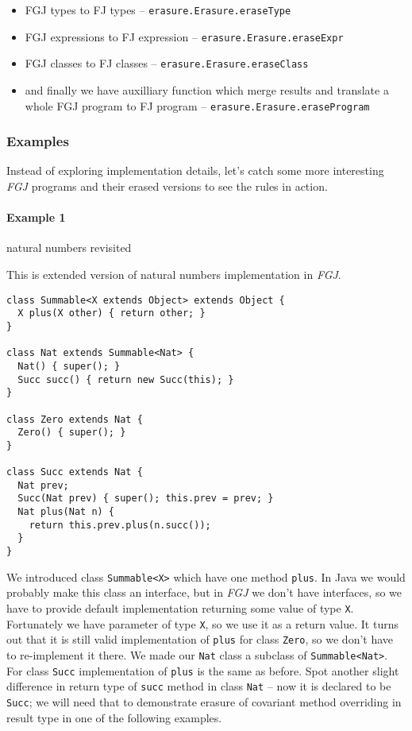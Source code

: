 \documentclass{article}[12pt]
\begin{document}
\begin{itemize}
\item FGJ types to FJ types -- \texttt{erasure.Erasure.eraseType}
\item FGJ expressions to FJ expression --
  \texttt{erasure.Erasure.eraseExpr}
\item FGJ classes to FJ classes -- \texttt{erasure.Erasure.eraseClass}
\item and finally we have auxilliary function which merge results
  and translate a whole FGJ program to FJ program --
  \texttt{erasure.Erasure.eraseProgram}
\end{itemize}

\subsubsection{Examples}

Instead of exploring implementation details, let's catch some more
interesting \emph{FGJ} programs and their erased versions to see
the rules in action.

\paragraph{Example 1} natural numbers revisited

This is extended version of natural numbers implementation in
\emph{FGJ}.

\begin{verbatim}
class Summable<X extends Object> extends Object {
  X plus(X other) { return other; }
}

class Nat extends Summable<Nat> {
  Nat() { super(); }
  Succ succ() { return new Succ(this); }
}

class Zero extends Nat { 
  Zero() { super(); }
}

class Succ extends Nat {
  Nat prev;
  Succ(Nat prev) { super(); this.prev = prev; }
  Nat plus(Nat n) {
    return this.prev.plus(n.succ());
  }
}
\end{verbatim}

We introduced class \texttt{Summable<X>} which have one method
\texttt{plus}. In Java we would probably make this class an
interface, but in \emph{FGJ} we don't have interfaces, so we have
to provide default implementation returning some value of type
\texttt{X}. Fortunately we have parameter of type \texttt{X},
so we use it as a return value. It turns out that it is still
valid implementation of \texttt{plus} for class \texttt{Zero},
so we don't have to re-implement it there. We made our
\texttt{Nat} class a subclass of \texttt{Summable<Nat>}. For
class \texttt{Succ} implementation of \texttt{plus} is the same
as before. Spot another slight difference in return type
of \texttt{succ} method in class \texttt{Nat} -- now it is
declared to be \texttt{Succ}; we will need that to demonstrate
erasure of covariant method overriding in result type in one of
the following examples.
\end{document}
